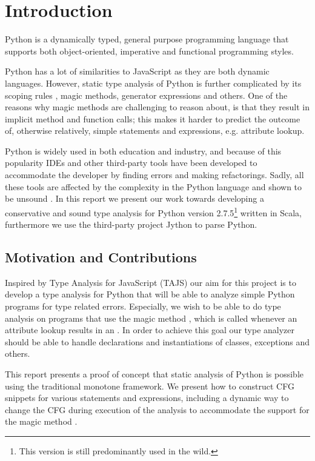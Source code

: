 \chapter{Introduction}
Python is a dynamically typed, general purpose programming language that supports both object-oriented, imperative and functional programming styles.

Python has a lot of similarities to JavaScript as they are both dynamic languages. However, static type analysis of Python is further complicated by its scoping rules \cite{lambdapy}, magic methods, generator expressions and others. One of the reasons why magic methods are challenging to reason about, is that they result in implicit method and function calls; this makes it harder to predict the outcome of, otherwise relatively, simple statements and expressions, e.g. attribute lookup.

Python is widely used in both education and industry, and because of this popularity IDEs \cite{ide.appcelerator, ide.jetbrains, ide.wingware} and other third-party tools \cite{tool.pep8, tool.pyflakes, tool.pychecker, tool.pylint} have been developed to accommodate the developer by finding errors and making refactorings. Sadly, all these tools are affected by the complexity in the Python language and shown to be unsound \cite{lamdapy}. In this report we present our work towards developing a conservative and sound type analysis for Python version 2.7.5\footnote{This version is still predominantly used in the wild.} written in Scala, furthermore we use the third-party project Jython \cite{jython} to parse Python.

\section{Motivation and Contributions}
Inspired by Type Analysis for JavaScript (TAJS) \cite{tajs} our aim for this project is to develop a type analysis for Python that will be able to analyze simple Python programs for type related errors. Especially, we wish to be able to do type analysis on programs that use the magic method , which is called whenever an attribute lookup results in an . In order to achieve this goal our type analyzer should be able to handle declarations and instantiations of classes, exceptions and others.

This report presents a proof of concept that static analysis of Python is possible using the traditional monotone framework. We present how to construct CFG snippets for various statements and expressions, including a dynamic way to change the CFG during execution of the analysis to accommodate the support for the magic method .  

